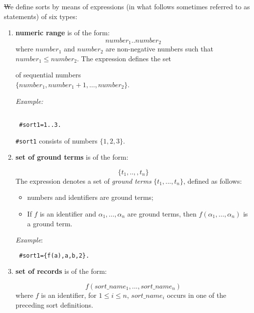 \documentclass[12pt, letterpaper]{article}
\begin{document}
\st We define sorts by means of expressions (in what follows sometimes referred to as statements) of six types:
\begin{enumerate}


\item\label{numrange}
\textbf{numeric range} is of the form:
\begin{equation*}
number_1..number_2
\end{equation*}
where $number_1$ and $number_2$ are non-negative numbers such that $number_1 \le number_2$. The expression defines the set 

of sequential numbers \\$\{number_1, number_1+1, \dots, number_2\}$.



\textit{Example:}



\begin{verbatim}

 #sort1=1..3.

\end{verbatim}

\texttt{\#sort1} consists of numbers $\{1,2,3\}$.



\item\label{groundset} \textbf{set of ground terms} is of the form:

\begin{equation*}
\{t_1,..,,t_n\}
\end{equation*}
The expression denotes a set of \textit{ground terms} $\{t_1,...,t_n\}$, defined as follows:
\begin{itemize}
 \item numbers and identifiers are ground terms;
 \item If $f$ is an identifier and $\alpha_1, \dots, \alpha_n$ are ground terms, 
then $f(\alpha_1,\dots, \alpha_n)$ is a ground term.
\end{itemize}

\textit{Example}: 
\begin{verbatim}
 #sort1={f(a),a,b,2}.
\end{verbatim}
\item\label{recordset} \textbf{set of records} is of the form:

\begin{equation*}
f(sort\_name_1,..., sort\_name_n)
\end{equation*}
where $f$ is an identifier, for $ 1\leq i\leq n$, $sort\_name_i$ occurs in one of the preceding sort definitions.


\end{enumerate}
\end{document}
